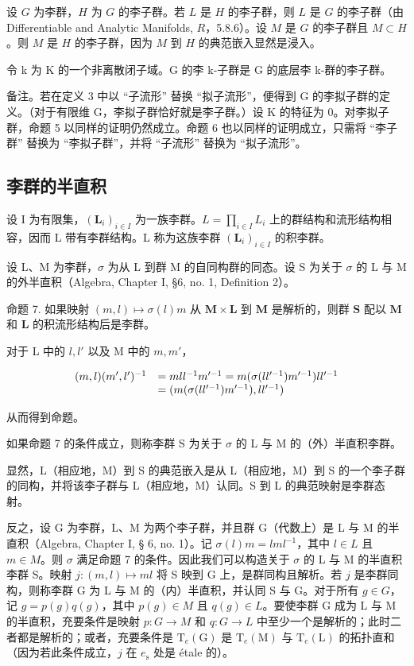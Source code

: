 设 \(G\) 为李群，\(H\) 为 \(G\) 的李子群。若 \(L\) 是 \(H\) 的李子群，则 \(L\) 是 \(G\) 的李子群（由 Differentiable and Analytic Manifolds, \(R\)，5.8.6）。设 \(M\) 是 \(G\) 的李子群且 \(M \subset H\)。则 \(M\) 是 \(H\) 的李子群，因为 \(M\) 到 \(H\) 的典范嵌入显然是浸入。

令 k 为 K 的一个非离散闭子域。G 的李 k-子群是 G 的底层李 k-群的李子群。

备注。若在定义 3 中以 ``子流形'' 替换 ``拟子流形''，便得到 G 的李拟子群的定义。（对于有限维 G，李拟子群恰好就是李子群。）设 K 的特征为 0。对李拟子群，命题 5 以同样的证明仍然成立。命题 6 也以同样的证明成立，只需将 ``李子群'' 替换为 ``李拟子群''，并将 ``子流形'' 替换为 ``拟子流形''。

\subsection{李群的半直积}

设 I 为有限集，\((\mathbf{L}_{i})_{i\in I}\) 为一族李群。\(L=\prod_{i\in I}L_{i}\) 上的群结构和流形结构相容，因而 L 带有李群结构。L 称为这族李群 \((\mathbf{L}_{i})_{i\in I}\) 的积李群。

设 L、M 为李群，\(\sigma\) 为从 L 到群 M 的自同构群的同态。设 S 为关于 \(\sigma\) 的 L 与 M 的外半直积（Algebra, Chapter I, §6, no. 1, Definition 2）。

命题 7. 如果映射 \((m, l) \mapsto \sigma(l)m\) 从 \(\mathbf{M} \times \mathbf{L}\) 到 \(\mathbf{M}\) 是解析的，则群 \(\mathbf{S}\) 配以 \(\mathbf{M}\) 和 \(\mathbf{L}\) 的积流形结构后是李群。

对于 L 中的 \(l, l'\) 以及 M 中的 \(m, m'\)，

\[
\begin{array}{r l} (m, l) (m ^ {\prime}, l ^ {\prime}) ^ {- 1} & = m l l ^ {- 1} m ^ {\prime - 1} = m (\sigma (l l ^ {\prime - 1}) m ^ {\prime - 1}) l l ^ {\prime - 1} \\ & = (m (\sigma (l l ^ {\prime - 1}) m ^ {\prime - 1}), l l ^ {\prime - 1}) \end{array}
\]

从而得到命题。

如果命题 7 的条件成立，则称李群 S 为关于 \(\sigma\) 的 L 与 M 的（外）半直积李群。

显然，L（相应地，M）到 S 的典范嵌入是从 L（相应地，M）到 S 的一个李子群的同构，并将该李子群与 L（相应地，M）认同。S 到 L 的典范映射是李群态射。

反之，设 G 为李群，L、M 为两个李子群，并且群 G（代数上）是 L 与 M 的半直积（Algebra, Chapter I, § 6, no. 1）。记 \(\sigma(l)m = lml^{-1}\)，其中 \(l \in L\) 且 \(m \in M\)。则 \(\sigma\) 满足命题 7 的条件。因此我们可以构造关于 \(\sigma\) 的 L 与 M 的半直积李群 S。映射 \(j: (m, l) \mapsto ml\) 将 S 映到 G 上，是群同构且解析。若 \(j\) 是李群同构，则称李群 G 为 L 与 M 的（内）半直积，并认同 S 与 G。对于所有 \(g \in G\)，记 \(g = p(g)q(g)\)，其中 \(p(g) \in M\) 且 \(q(g) \in L\)。要使李群 G 成为 L 与 M 的半直积，充要条件是映射 \(p: G \to M\) 和 \(q: G \to L\) 中至少一个是解析的；此时二者都是解析的；或者，充要条件是 \(\mathrm{T}_{e}(\mathrm{G})\) 是 \(\mathrm{T}_{e}(\mathrm{M})\) 与 \(\mathrm{T}_{e}(\mathrm{L})\) 的拓扑直和（因为若此条件成立，\(j\) 在 \(e_{\mathrm{s}}\) 处是 étale 的）。

